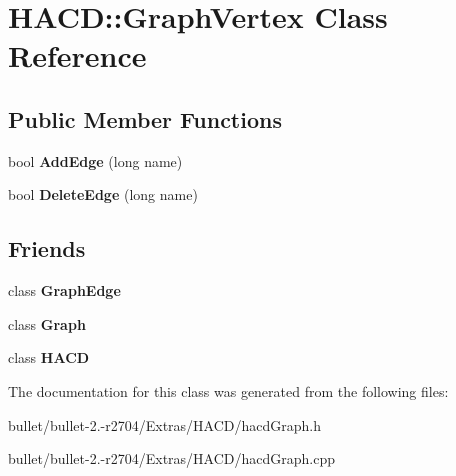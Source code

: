 \hypertarget{class_h_a_c_d_1_1_graph_vertex}{\section{H\+A\+C\+D\+:\+:Graph\+Vertex Class Reference}
\label{class_h_a_c_d_1_1_graph_vertex}
}
\subsection*{Public Member Functions}
\begin{DoxyCompactItemize}
\item 
\hypertarget{class_h_a_c_d_1_1_graph_vertex_adefe6a35bdabf0ba76f9c3299a576ee6}{bool {\bfseries Add\+Edge} (long name)}\label{class_h_a_c_d_1_1_graph_vertex_adefe6a35bdabf0ba76f9c3299a576ee6}

\item 
\hypertarget{class_h_a_c_d_1_1_graph_vertex_a8b2cf4d873c2b13c143cf72264b7e39d}{bool {\bfseries Delete\+Edge} (long name)}\label{class_h_a_c_d_1_1_graph_vertex_a8b2cf4d873c2b13c143cf72264b7e39d}

\end{DoxyCompactItemize}
\subsection*{Friends}
\begin{DoxyCompactItemize}
\item 
\hypertarget{class_h_a_c_d_1_1_graph_vertex_a84b8e7bc6d8fb2b88fbbea35ba045b9d}{class {\bfseries Graph\+Edge}}\label{class_h_a_c_d_1_1_graph_vertex_a84b8e7bc6d8fb2b88fbbea35ba045b9d}

\item 
\hypertarget{class_h_a_c_d_1_1_graph_vertex_afab89afd724f1b07b1aaad6bdc61c47a}{class {\bfseries Graph}}\label{class_h_a_c_d_1_1_graph_vertex_afab89afd724f1b07b1aaad6bdc61c47a}

\item 
\hypertarget{class_h_a_c_d_1_1_graph_vertex_ab3497bc7797561d0c79ecef2f462e43a}{class {\bfseries H\+A\+C\+D}}\label{class_h_a_c_d_1_1_graph_vertex_ab3497bc7797561d0c79ecef2f462e43a}

\end{DoxyCompactItemize}


The documentation for this class was generated from the following files\+:\begin{DoxyCompactItemize}
\item 
bullet/bullet-\/2.-\/r2704/\+Extras/\+H\+A\+C\+D/hacd\+Graph.\+h\item 
bullet/bullet-\/2.-\/r2704/\+Extras/\+H\+A\+C\+D/hacd\+Graph.\+cpp\end{DoxyCompactItemize}
